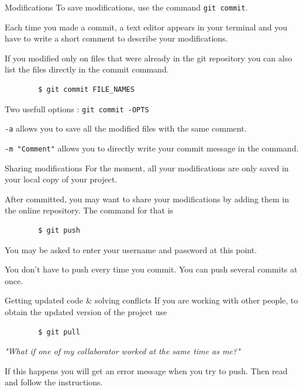 \documentclass{beamer}
\begin{document}
	\begin{frame}[fragile]{Modifications}	
		To save modifications, use the command \texttt{git commit}. \newline 
		
		Each time you made a commit, a text editor appears in your terminal and you have to write a short comment to describe your modifications. \newline
		
		If you modified only on files that were already in the git repository you can also list the files directly in the commit command. 
		\begin{verbatim}
		$ git commit FILE_NAMES
		\end{verbatim}
		
		Two usefull options : \texttt{git commit -OPTS}
		
		\texttt{-a} allows you to save all the modified files with the same comment.
		 
		\texttt{-m "Comment"} allows you to directly write your commit message in the command. 		
	\end{frame}

	\begin{frame}[fragile]{Sharing modifications}
		For the moment, all your modifications are only saved in your local copy of your project. 
		
		After committed, you may want to share your modifications by adding them in the online repository. The command for that is 
		
		\begin{verbatim}
		$ git push
		\end{verbatim}
		
		You may be asked to enter your username and password at this point.
		
		You don't have to push every time you commit. You can push several commits at once. 
	\end{frame}
	
	\begin{frame}[fragile]{Getting updated code \& solving conflicts}
		If you are working with other people, to obtain the updated version of the project use 
		\begin{verbatim}
		$ git pull
		\end{verbatim}
		
		\textit{"What if one of my collaborator worked at the same time as me?"}
		
		If this happens you will get an error message when you try to push. Then read and follow the instructions. 
	\end{frame}
\end{document}

